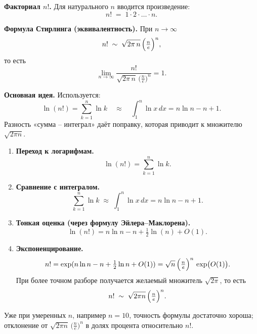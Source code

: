 

\textbf{Факториал $n!$.}
Для натурального $n$ вводится произведение:
\[
n! \;=\;1\cdot2\cdot\dots\cdot n.
\]

\medskip

\textbf{Формула Стирлинга (эквивалентность).}
При $n\to\infty$
\[
n! \;\sim\;\sqrt{2\pi\,n}\,\Bigl(\tfrac{n}{e}\Bigr)^n,
\]
то есть
\[
\lim_{n\to\infty}\frac{n!}{\sqrt{2\pi\,n}\,\bigl(\tfrac{n}{e}\bigr)^n}=1.
\]

\medskip


\textbf{Основная идея.}
Используется:
\[
\ln(n!)=\sum_{k=1}^n\ln k
\quad\approx\quad
\int_{1}^{n}\ln x\,dx=n\ln n - n +1.
\]
Разность «сумма – интеграл» даёт поправку, которая приводит к множителю \(\sqrt{2\pi n}\).

\medskip


\begin{enumerate}
  \item \textbf{Переход к логарифмам.}
    \[
      \ln(n!)=\sum_{k=1}^n\ln k.
    \]
  \item \textbf{Сравнение с интегралом.}
    \[
      \sum_{k=1}^n\ln k
      \;\approx\;\int_{1}^{n}\ln x\,dx
      = n\ln n - n + 1.
    \]
  \item \textbf{Тонкая оценка (через формулу Эйлера–Маклорена).}
    \[
      \ln(n!)=n\ln n - n +\tfrac12\ln(n)+O(1).
    \]
  \item \textbf{Экспоненцирование.}
    \[
      n!=\exp(n\ln n - n +\tfrac12\ln n +O(1))
      =\sqrt{n}\,\Bigl(\tfrac{n}{e}\Bigr)^n\,\exp\bigl(O(1)\bigr).
    \]
    При более точном разборе получается желаемый множитель \(\sqrt{2\pi}\), то есть
    \[
      n!\;\sim\;\sqrt{2\pi n}\,\Bigl(\tfrac{n}{e}\Bigr)^n.
    \]
\end{enumerate}

\medskip


Уже при умеренных $n$, например $n=10$, точность формулы достаточно хороша; отклонение от \(\sqrt{2\pi n}\,\bigl(\tfrac{n}{e}\bigr)^n\) в долях процента относительно $n!$.

